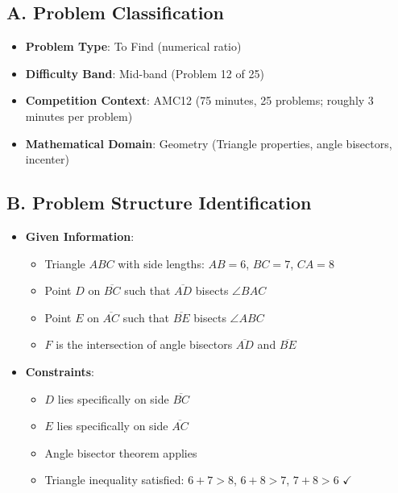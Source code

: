 \documentclass[12pt]{article}
\begin{document}
\begin{problemconfigbox}
\subsection*{A. Problem Classification}
\begin{itemize}[leftmargin=*]
    \item \textbf{Problem Type}: To Find (numerical ratio)
    \item \textbf{Difficulty Band}: Mid-band (Problem 12 of 25)
    \item \textbf{Competition Context}: AMC12 (75 minutes, 25 problems; roughly 3 minutes per problem)
    \item \textbf{Mathematical Domain}: Geometry (Triangle properties, angle bisectors, incenter)
\end{itemize}

\subsection*{B. Problem Structure Identification}
\begin{itemize}[leftmargin=*]
    \item \textbf{Given Information}: 
    \begin{itemize}
        \item Triangle $ABC$ with side lengths: $AB = 6$, $BC = 7$, $CA = 8$
        \item Point $D$ on $\overline{BC}$ such that $\overline{AD}$ bisects $\angle BAC$
        \item Point $E$ on $\overline{AC}$ such that $\overline{BE}$ bisects $\angle ABC$
        \item $F$ is the intersection of angle bisectors $\overline{AD}$ and $\overline{BE}$
    \end{itemize}
    
    \item \textbf{Constraints}: 
    \begin{itemize}
        \item $D$ lies specifically on side $\overline{BC}$
        \item $E$ lies specifically on side $\overline{AC}$
        \item Angle bisector theorem applies
        \item Triangle inequality satisfied: $6 + 7 > 8$, $6 + 8 > 7$, $7 + 8 > 6$ $\checkmark$
    \end{itemize}
    

\end{itemize}
\end{problemconfigbox}
\end{document}
